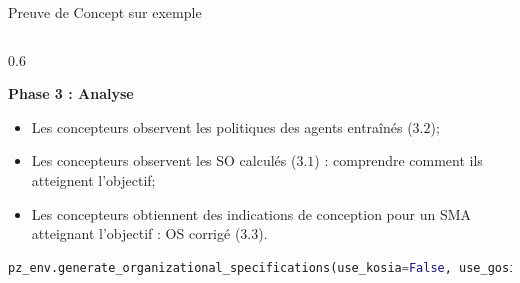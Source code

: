     \begin{frame}[fragile]{Preuve de Concept sur exemple}
    
    \begin{columns}
    
        \begin{column}{0.6\textwidth}
    
            \textbf{Phase 3 : Analyse}
    
            \begin{itemize}
                \item Les concepteurs observent les politiques des agents entraînés ($3.2$);
                \item Les concepteurs observent les SO calculés ($3.1$) : comprendre comment ils atteignent l'objectif;
                \item Les concepteurs obtiennent des indications de conception pour un SMA atteignant l'objectif : OS corrigé ($3.3$).
            \end{itemize}

            \begin{lstlisting}[language=Python,basicstyle=\scriptsize]
pz_env.generate_organizational_specifications(use_kosia=False, use_gosia=True,gosia_configuration={"generate_figures": True})
            \end{lstlisting}

        \end{column}
    

\end{columns}
\end{frame}
